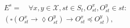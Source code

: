 \documentclass[journal,compsoc]{IEEEtran}
\begin{document}
\begin{align}\label{eqn:Causal}
\begin{split}
 E^{s} =   \quad \forall x,y \in \mathcal{X}, \mathit{st} \in \mathit{S_t}, O_\mathit{st}^x, O_\mathit{st}^{y} \in \mathit{st}: \\ \left( \square \left( O_\mathit{st}^x \rightarrow \lozenge O_\mathit{st}^{y} \right) 
 \rightarrow O_\mathit{st}^x \preccurlyeq O_\mathit{st}^{y} \right), 
 \end{split}
  \end{align} %
\end{document}
